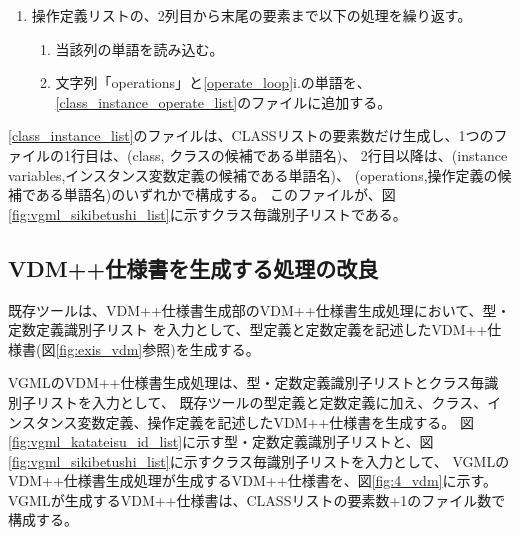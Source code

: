 \begin{enumerate}
\begin{enumerate}
            \label{class_instance_operate_list}
            \item 操作定義リストの、2列目から末尾の要素まで以下の処理を繰り返す。
            \label{operate_loop}
                \begin{enumerate}
                    \item 当該列の単語を読み込む。
                    \label{operate_word}
                    \item 文字列「operations」と\ref{operate_loop}i.の単語を、\ref{class_instance_operate_list}のファイルに追加する。
                \end{enumerate}
        \end{enumerate}
\end{enumerate}

\ref{class_instance_list}のファイルは、CLASSリストの要素数だけ生成し、1つのファイルの1行目は、(class, クラスの候補である単語名)、
2行目以降は、(instance variables,インスタンス変数定義の候補である単語名)、 (operations,操作定義の候補である単語名)のいずれかで構成する。
このファイルが、図\ref{fig:vgml_sikibetushi_list}に示すクラス毎識別子リストである。

\subsection{VDM++仕様書を生成する処理の改良}
既存ツールは、VDM++仕様書生成部のVDM++仕様書生成処理において、型・定数定義識別子リスト
を入力として、型定義と定数定義を記述したVDM++仕様書(図\ref{fig:exis_vdm}参照)を生成する。

VGMLのVDM++仕様書生成処理は、型・定数定義識別子リストとクラス毎識別子リストを入力として、
既存ツールの型定義と定数定義に加え、クラス、インスタンス変数定義、操作定義を記述したVDM++仕様書を生成する。
図\ref{fig:vgml_katateisu_id_list}に示す型・定数定義識別子リストと、図\ref{fig:vgml_sikibetushi_list}に示すクラス毎識別子リストを入力として、
VGMLのVDM++仕様書生成処理が生成するVDM++仕様書を、図\ref{fig:4_vdm}に示す。
VGMLが生成するVDM++仕様書は、CLASSリストの要素数+1のファイル数で構成する。

